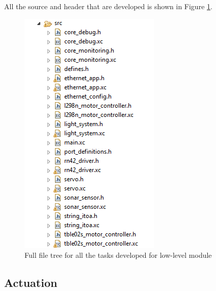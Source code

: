All the source and header that are developed is shown in Figure \ref{fig:fullfiletree}.
\begin{figure}[!ht]
	\includegraphics[scale=0.8]{content/images/fullfiletree.png}
	\caption{Full file tree for all the tasks developed for low-level module}
	\label{fig:fullfiletree}
\end{figure}
\newpage
\subsection{Actuation}
